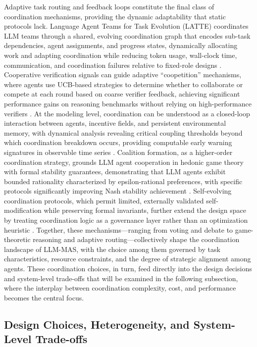 \documentclass[11pt]{article}
\begin{document}
Adaptive task routing and feedback loops constitute the final class of coordination mechanisms, providing the dynamic adaptability that static protocols lack. Language Agent Teams for Task Evolution (LATTE) coordinates LLM teams through a shared, evolving coordination graph that encodes sub-task dependencies, agent assignments, and progress states, dynamically allocating work and adapting coordination while reducing token usage, wall-clock time, communication, and coordination failures relative to fixed-role designs \cite{ref94}. Cooperative verification signals can guide adaptive ``coopetition'' mechanisms, where agents use UCB-based strategies to determine whether to collaborate or compete at each round based on coarse verifier feedback, achieving significant performance gains on reasoning benchmarks without relying on high-performance verifiers \cite{ref95}. At the modeling level, coordination can be understood as a closed-loop interaction between agents, incentive fields, and persistent environmental memory, with dynamical analysis revealing critical coupling thresholds beyond which coordination breakdown occurs, providing computable early warning signatures in observable time series \cite{ref96}. Coalition formation, as a higher-order coordination strategy, grounds LLM agent cooperation in hedonic game theory with formal stability guarantees, demonstrating that LLM agents exhibit bounded rationality characterized by epsilon-rational preferences, with specific protocols significantly improving Nash stability achievement \cite{ref97}. Self-evolving coordination protocols, which permit limited, externally validated self-modification while preserving formal invariants, further extend the design space by treating coordination logic as a governance layer rather than an optimization heuristic \cite{ref98}. Together, these mechanisms---ranging from voting and debate to game-theoretic reasoning and adaptive routing---collectively shape the coordination landscape of LLM-MAS, with the choice among them governed by task characteristics, resource constraints, and the degree of strategic alignment among agents. These coordination choices, in turn, feed directly into the design decisions and system-level trade-offs that will be examined in the following subsection, where the interplay between coordination complexity, cost, and performance becomes the central focus.

\subsection{Design Choices, Heterogeneity, and System-Level Trade-offs}
\end{document}
